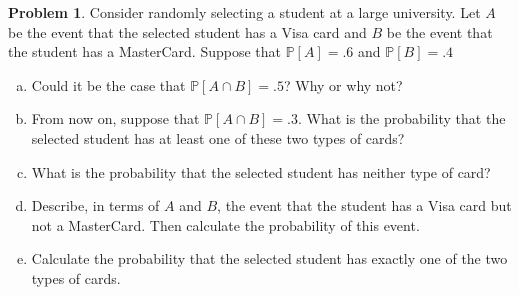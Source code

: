 \documentclass[10pt]{article}
\theoremstyle{definition}
\newtheorem{problem}[theorem]{Problem}
\newcommand{\1}[1]{\textbf{1}_{\left[#1\right]}} %
\def\P{\mathbb{P}} %
\begin{document}
\begin{problem}
  Consider randomly selecting a student at a large university. Let $A$ be the
  event that the selected student has a Visa card and $B$ be the event that
  the student has a MasterCard. Suppose that $\P\left[A \right]=.6$ and
  $\P\left[B \right]=.4$
  \begin{enumerate}[(a)]
    \item Could it be the case that $\P\left[A\cap B \right] = .5$? Why or why
    not?
    \item From now on, suppose that $\P\left[A\cap B \right]=.3$. What is the
    probability that the selected student has at least one of these two types
    of cards?
    \item What is the probability that the selected student has neither type
    of card?
    \item Describe, in terms of $A$ and $B$, the event that the student has a
    Visa card but not a MasterCard. Then calculate the probability of this
    event.
    \item Calculate the probability that the selected student has exactly one
    of the two types of cards.
  \end{enumerate}
\end{problem}
\end{document}
